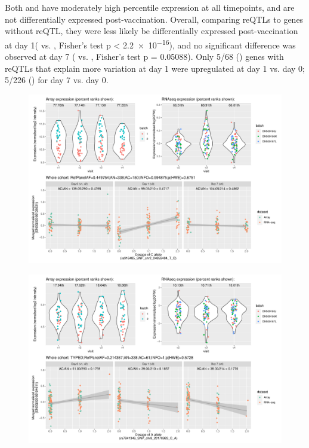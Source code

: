 Both  and  have moderately high percentile expression at all timepoints, and are not differentially expressed post-vaccination.
Overall, comparing \glspl{reQTL} to genes without reQTL,
they were less likely be differentially expressed post-vaccination at day 1( vs. , Fisher's test p < \num{2.2e-16}),
and no significant difference was observed at day 7 ( vs. , Fisher's test p = \num{0.05088}).
Only 5/68 () genes with \glspl{reQTL} that explain more variation at day 1 were upregulated at day 1 vs. day 0; 5/226 () for day 7 vs. day 0.

\begin{figure}
    \centering
    \includegraphics[width=1.0\textwidth,page=1]{mainmatter/figures/chapter_03/plot_dge_eqtl_genotypes.ENSG00000138031,rs916485_SNP_chr2_24859404_T_C.pdf}
    \caption{}
    \label{fig:hird_eQTL_ploteQTL_ADCY3}
\end{figure}

\begin{figure}
    \centering
    \includegraphics[width=1.0\textwidth,page=1]{mainmatter/figures/chapter_03/plot_dge_eqtl_genotypes.ENSG00000104611,rs7841346_SNP_chr8_20170963_C_A.pdf}
    \caption{}
    \label{fig:hird_eQTL_ploteQTL_SH2D4A}
\end{figure}

